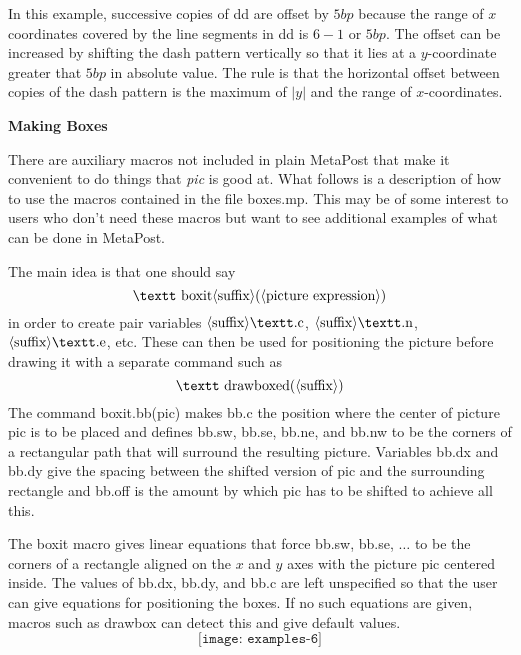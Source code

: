 \documentclass{article}
\def\descr#1{{\langle\hbox{#1}\rangle}}
\def\lit#1{{\hbox{\textt#1}}}
\def\okbreak{\vfil\penalty2000 \vfilneg}
\begin{document}
In this example, successive copies of \lit{dd} are offset by $5bp$ because
the range of $x$ coordinates covered by the line segments in \lit{dd} is
$6-1$ or $5bp$.  The offset can be increased by shifting the dash pattern
vertically so that it lies at a $y$-coordinate greater that $5bp$ in
absolute value.  The rule is that the horizontal offset between copies of
the dash pattern is the maximum of $|y|$ and the range of $x$-coordinates.

\bigbreak
\centerline{\bf Making Boxes}
\nobreak\medskip
There are auxiliary macros not included in plain MetaPost that make it
convenient to do things that {\it pic} is good at.  What follows
is a description of how to use the macros contained in the file \lit{boxes.mp}.
This may be of some interest to users who don't need these macros but want to
see additional examples of what can be done in MetaPost.

The main idea is that one should say
$$ \lit{boxit} \descr{suffix}(\descr{picture expression}) $$
in order to create pair variables $\descr{suffix}\lit{.c}$,
$\descr{suffix}\lit{.n}$, $\descr{suffix}\lit{.e}$, etc.  These can then be
used for positioning the picture before drawing it with a separate command such
as
$$ \lit{drawboxed}(\descr{suffix}) $$
The command \lit{boxit.bb(pic)} makes \lit{bb.c} the position where the center
of picture \lit{pic} is to be placed and defines \lit{bb.sw}, \lit{bb.se},
\lit{bb.ne}, and \lit{bb.nw} to be the corners of a rectangular path that will
surround the resulting picture.  Variables \lit{bb.dx} and \lit{bb.dy} give
the spacing between the shifted version of \lit{pic} and the surrounding
rectangle and \lit{bb.off} is the amount by which \lit{pic} has to be shifted
to achieve all this.

The \lit{boxit} macro gives linear equations that force \lit{bb.sw},
\lit{bb.se}, $\ldots$ to be the corners of a rectangle aligned on the $x$ and
$y$ axes with the picture \lit{pic} centered inside.  The values of \lit{bb.dx},
\lit{bb.dy}, and \lit{bb.c} are left unspecified so that the user can give
equations for positioning the boxes.  If no such equations are given, macros
such as \lit{drawbox} can detect this and give default values.\vadjust{\okbreak}
$$ \texttt{[image: examples-6]} $$

\okbreak
\end{document}
